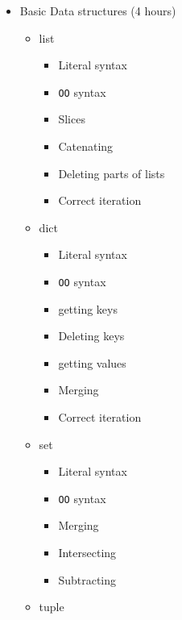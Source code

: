 \documentclass[
]{article}
\providecommand{\tightlist}{%
  \setlength{\itemsep}{0pt}\setlength{\parskip}{0pt}}
\begin{document}
\begin{itemize}
\begin{itemize}
    \begin{itemize}
    \tightlist
    \item
      Different quotes (\texttt{\textquotesingle{}}, \texttt{"},
      \texttt{"""})
    \item
      Concatenating strings
    \item
      String formatting and formatting aids
    \item
      String slices
    \item
      Splitting and joining * \texttt{Unicode} in \texttt{Python}
    \item
      \texttt{bool}
    \end{itemize}
  \end{itemize}
\item
  Basic Data structures (4 hours)

  \begin{itemize}
  \tightlist
  \item
    list

    \begin{itemize}
    \tightlist
    \item
      Literal syntax
    \item
      \texttt{OO} syntax
    \item
      Slices
    \item
      Catenating
    \item
      Deleting parts of lists
    \item
      Correct iteration
    \end{itemize}
  \item
    dict

    \begin{itemize}
    \tightlist
    \item
      Literal syntax
    \item
      \texttt{OO} syntax
    \item
      getting keys
    \item
      Deleting keys
    \item
      getting values
    \item
      Merging
    \item
      Correct iteration
    \end{itemize}
  \item
    set

    \begin{itemize}
    \tightlist
    \item
      Literal syntax
    \item
      \texttt{OO} syntax
    \item
      Merging
    \item
      Intersecting
    \item
      Subtracting
    \end{itemize}
  \item
    tuple


\end{itemize}
\end{itemize}
\end{document}
